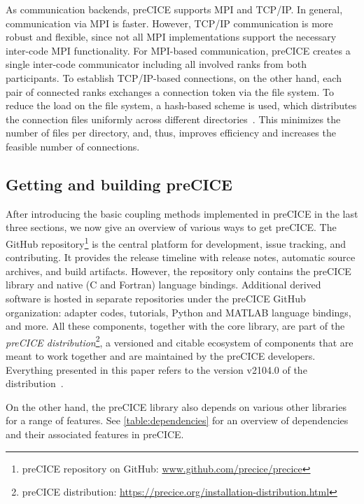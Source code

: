 As communication backends, preCICE supports MPI and TCP/IP.
In general, communication via MPI is faster. However, TCP/IP communication is more robust and flexible, since not all MPI implementations support the necessary inter-code MPI functionality. For MPI-based communication, preCICE creates a single inter-code communicator including all involved ranks from both participants. To establish TCP/IP-based connections, on the other hand, each pair of connected ranks exchanges a connection token via the file system. To reduce the load on the file system, a hash-based scheme is used, which distributes the connection files uniformly across different directories~\cite{Lindner2020_ExaFSA, Lindner2019}. This minimizes the number of files per directory, and, thus, improves efficiency and increases the feasible number of connections.

\subsection{Getting and building preCICE}
\label{ssec:building}

After introducing the basic coupling methods implemented in preCICE in the last three sections, we now give an overview of various ways to get preCICE.
The GitHub repository\footnote{preCICE repository on GitHub: \url{www.github.com/precice/precice}} is the central platform for development,
issue tracking, and contributing. It provides the release timeline with release notes, automatic source archives, and build artifacts. However, the repository 
only contains the preCICE library and native (C and Fortran) language bindings. Additional derived software is hosted in separate repositories under the preCICE GitHub organization: 
adapter codes, tutorials, Python and MATLAB language bindings, and more.
All these components, together with the core library, are part of the \textit{preCICE distribution}\footnote{preCICE distribution: \url{https://precice.org/installation-distribution.html}}, a versioned and citable ecosystem of components that are meant to work together and are maintained by the preCICE developers. Everything presented in this paper refers to the version v2104.0 of the distribution~\cite{Chourdakis2021_Distribution}.

On the other hand, the preCICE library also depends on various other libraries for a range of features. See \autoref{table:dependencies} for an overview of dependencies and their associated features in preCICE.

